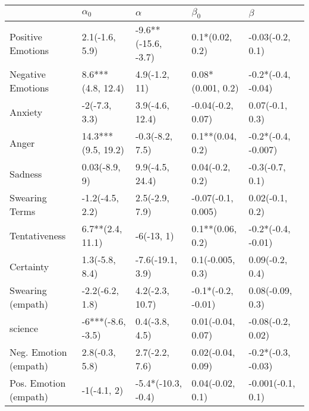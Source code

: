 \begin{tabular}{lllll}
\toprule
{} &          $\alpha_0$ &             $\alpha$ &           $\beta_0$ &              $\beta$ \\
\midrule
Positive Emotions     &      2.1(-1.6, 5.9) &  -9.6**(-15.6, -3.7) &     0.1*(0.02, 0.2) &     -0.03(-0.2, 0.1) \\
Negative Emotions     &   8.6***(4.8, 12.4) &        4.9(-1.2, 11) &   0.08*(0.001, 0.2) &   -0.2*(-0.4, -0.04) \\
Anxiety               &       -2(-7.3, 3.3) &      3.9(-4.6, 12.4) &   -0.04(-0.2, 0.07) &      0.07(-0.1, 0.3) \\
Anger                 &  14.3***(9.5, 19.2) &      -0.3(-8.2, 7.5) &    0.1**(0.04, 0.2) &  -0.2*(-0.4, -0.007) \\
Sadness               &       0.03(-8.9, 9) &      9.9(-4.5, 24.4) &     0.04(-0.2, 0.2) &      -0.3(-0.7, 0.1) \\
Swearing Terms        &     -1.2(-4.5, 2.2) &       2.5(-2.9, 7.9) &  -0.07(-0.1, 0.005) &      0.02(-0.1, 0.2) \\
Tentativeness         &    6.7**(2.4, 11.1) &           -6(-13, 1) &    0.1**(0.06, 0.2) &   -0.2*(-0.4, -0.01) \\
Certainty             &      1.3(-5.8, 8.4) &     -7.6(-19.1, 3.9) &    0.1(-0.005, 0.3) &      0.09(-0.2, 0.4) \\
Swearing (empath)     &     -2.2(-6.2, 1.8) &      4.2(-2.3, 10.7) &  -0.1*(-0.2, -0.01) &     0.08(-0.09, 0.3) \\
science               &   -6***(-8.6, -3.5) &       0.4(-3.8, 4.5) &   0.01(-0.04, 0.07) &    -0.08(-0.2, 0.02) \\
Neg. Emotion (empath) &      2.8(-0.3, 5.8) &       2.7(-2.2, 7.6) &   0.02(-0.04, 0.09) &   -0.2*(-0.3, -0.03) \\
Pos. Emotion (empath) &         -1(-4.1, 2) &   -5.4*(-10.3, -0.4) &    0.04(-0.02, 0.1) &    -0.001(-0.1, 0.1) \\
\bottomrule
\end{tabular}
